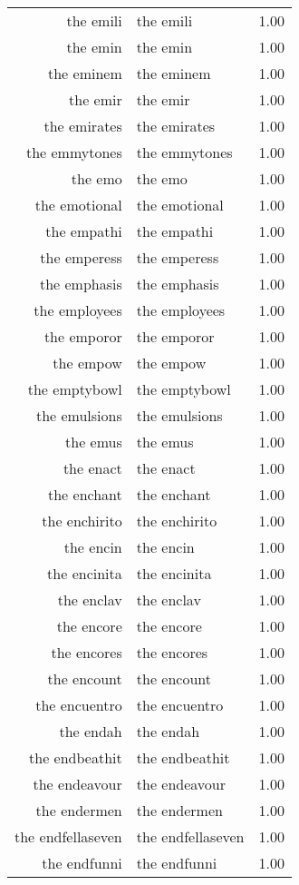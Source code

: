 \begin{table}[ht]
\begin{tabular}{rlr}
  the emili & the emili & 1.00 \\ 
  the emin & the emin & 1.00 \\ 
  the eminem & the eminem & 1.00 \\ 
  the emir & the emir & 1.00 \\ 
  the emirates & the emirates & 1.00 \\ 
  the emmytones & the emmytones & 1.00 \\ 
  the emo & the emo & 1.00 \\ 
  the emotional & the emotional & 1.00 \\ 
  the empathi & the empathi & 1.00 \\ 
  the emperess & the emperess & 1.00 \\ 
  the emphasis & the emphasis & 1.00 \\ 
  the employees & the employees & 1.00 \\ 
  the emporor & the emporor & 1.00 \\ 
  the empow & the empow & 1.00 \\ 
  the emptybowl & the emptybowl & 1.00 \\ 
  the emulsions & the emulsions & 1.00 \\ 
  the emus & the emus & 1.00 \\ 
  the enact & the enact & 1.00 \\ 
  the enchant & the enchant & 1.00 \\ 
  the enchirito & the enchirito & 1.00 \\ 
  the encin & the encin & 1.00 \\ 
  the encinita & the encinita & 1.00 \\ 
  the enclav & the enclav & 1.00 \\ 
  the encore & the encore & 1.00 \\ 
  the encores & the encores & 1.00 \\ 
  the encount & the encount & 1.00 \\ 
  the encuentro & the encuentro & 1.00 \\ 
  the endah & the endah & 1.00 \\ 
  the endbeathit & the endbeathit & 1.00 \\ 
  the endeavour & the endeavour & 1.00 \\ 
  the endermen & the endermen & 1.00 \\ 
  the endfellaseven & the endfellaseven & 1.00 \\ 
  the endfunni & the endfunni & 1.00 \\ 

\end{tabular}
\end{table}
